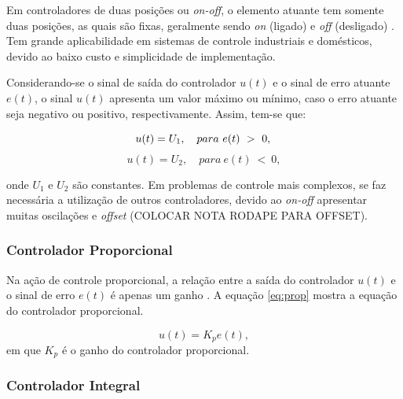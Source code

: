 Em controladores de duas posições ou \textit{on-off}, o elemento atuante tem somente duas posições, as quais são fixas, geralmente sendo 
\textit{on} (ligado) e \textit{off} (desligado) \cite{ogata}. Tem grande aplicabilidade em sistemas de controle industriais e 
domésticos, devido ao baixo custo e simplicidade de implementação.

Considerando-se o sinal de saída do controlador $u(t)$ %
e o sinal de erro atuante $e(t)$, o sinal $u(t)$ apresenta um valor máximo ou mínimo, caso o erro atuante seja negativo ou positivo, 
respectivamente. Assim, tem-se que:

\begin{equation}
 u(t) = U_1, \quad para \ e(t) \ > \ 0, \\ 
\end{equation}
\begin{equation}
 u(t) = U_2, \quad para \ e(t) \ < \ 0,
\end{equation}

onde $U_1$ e $U_2$ são constantes.
Em problemas de controle mais complexos, se faz necessária a utilização de outros controladores, devido ao \textit{on-off} apresentar 
muitas oscilações e \textit{offset} (COLOCAR NOTA RODAPE PARA OFFSET).

\subsubsection{Controlador Proporcional}


Na ação de controle proporcional, a relação entre a saída do controlador $u(t)$ e o sinal de erro $e(t)$ é apenas um ganho \cite{lima}. 
A equação \ref{eq:prop} mostra a equação do controlador proporcional.

\begin{equation}\label{eq:prop}
 u(t) = K_pe(t),	
\end{equation}
em que $K_p$ é o ganho do controlador proporcional.


\subsubsection{Controlador Integral}

